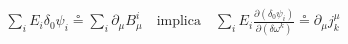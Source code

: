 \documentclass[preview]{standalone}
\begin{document}
\begin{align*}
\sum_i E_i\delta_0\psi_i \circeq \sum_i \partial_{\mu}B_{\mu}^{i} \quad \text{implica} \quad \sum_i E_i\frac{\partial(\delta_0\psi_i)}{\partial(\delta\omega^k)} \circeq \partial_{\mu}j_{k}^{\mu}
\end{align*}
\end{document}
